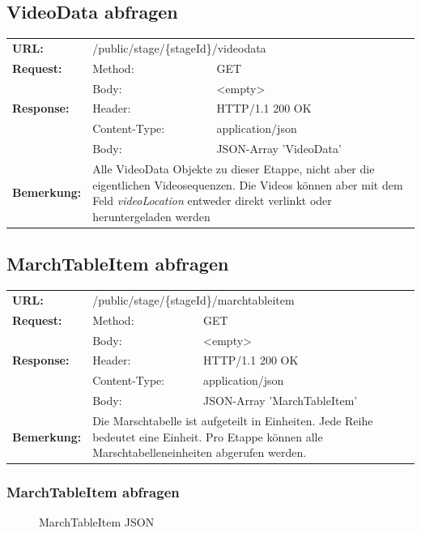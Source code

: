 \subsection{VideoData abfragen}	
\begin{longtable}{ p{2.5cm} p{3.5cm} p{6cm}}
	\textbf{URL:} & \multicolumn{2}{l}{/public/stage/\{stageId\}/videodata} \\
	\textbf{Request:} & Method: & GET \\
		& Body: & <empty>\\
	\textbf{Response:} &  Header: & HTTP/1.1 200 OK \\
		& Content-Type: & application/json \\
		& Body: & JSON-Array 'VideoData'\\
	\textbf{Bemerkung:} & \multicolumn{2}{p{10cm}}{Alle VideoData Objekte zu dieser Etappe, nicht aber die eigentlichen Videosequenzen. Die Videos können aber mit dem Feld \textit{videoLocation} entweder direkt verlinkt oder heruntergeladen werden}
\end{longtable}

\subsection{MarchTableItem abfragen}
\begin{longtable}{ p{2.5cm} p{3.5cm} p{6cm}}
	\textbf{URL:} & \multicolumn{2}{l}{/public/stage/\{stageId\}/marchtableitem} \\
	\textbf{Request:} & Method: & GET \\
		& Body: & <empty>\\
	\textbf{Response:} &  Header: & HTTP/1.1 200 OK \\
		& Content-Type: & application/json \\
		& Body: & JSON-Array 'MarchTableItem'\\
	\textbf{Bemerkung:} & \multicolumn{2}{p{10cm}}{Die Marschtabelle ist aufgeteilt in Einheiten. Jede Reihe bedeutet eine Einheit. Pro Etappe können alle Marschtabelleneinheiten abgerufen werden.}
\end{longtable}

\subsubsection{MarchTableItem abfragen}
\begin{figure}[H]
	\centering
	
	\caption{MarchTableItem JSON}
\end{figure}

